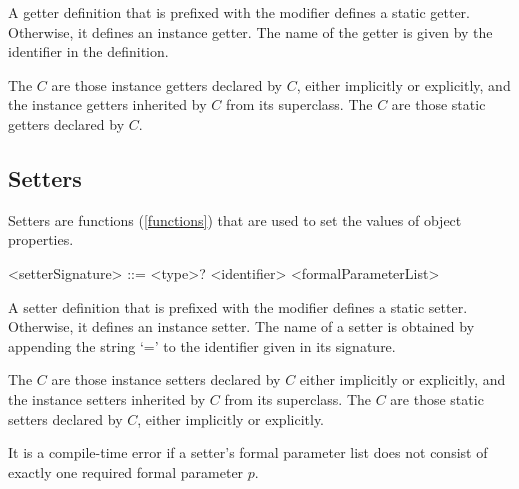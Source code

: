 \documentclass[makeidx]{article}
\begin{document}
\LMHash{}%
A getter definition that is prefixed with the \STATIC{} modifier defines a static getter.
Otherwise, it defines an instance getter.
The name of the getter is given by the identifier in the definition.

\LMHash{}%
The  $C$ are
those instance getters declared by $C$,
either implicitly or explicitly,
and the instance getters inherited by $C$ from its superclass.
The  $C$ are
those static getters declared by $C$.



\subsection{Setters}

\LMHash{}%
Setters are functions (\ref{functions}) that are used to set the values of object properties.

\begin{grammar}
<setterSignature> ::= <type>? \SET{} <identifier> <formalParameterList>
\end{grammar}


\LMHash{}%
A setter definition that is prefixed with the \STATIC{} modifier defines a static setter.
Otherwise, it defines an instance setter.
The name of a setter is obtained by appending the string `=' to the identifier given in its signature.


\LMHash{}%
The  $C$ are
those instance setters declared by $C$
either implicitly or explicitly,
and the instance setters inherited by $C$ from its superclass.
The  $C$ are
those static setters declared by $C$,
either implicitly or explicitly.

\LMHash{}%
It is a compile-time error if a setter's formal parameter list
does not consist of exactly one required formal parameter $p$.
\end{document}
